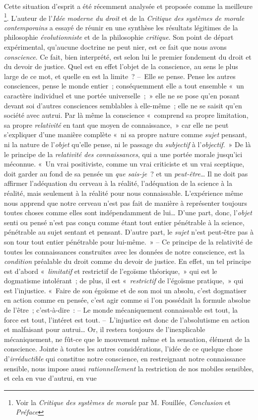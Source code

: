 \documentclass[french,twoside]{book} %
\begin{document}
Cette situation d’esprit a été récemment analysée et proposée comme la meilleure \footnote{Voir la \emph{Critique des systèmes de morale} par M. Fouillée, \emph{Conclusion} et \emph{Préface}}. L’auteur de l’\emph{Idée moderne du droit} et de la \emph{Critique des systèmes de morale contemporains} a essayé de réunir en une synthèse les résultats légitimes de la philosophie \emph{évolutionniste} et de la philosophie \emph{critique}. Son point de départ expérimental, qu’aucune doctrine ne peut nier, est ce fait que nous avons \emph{conscience}. Ce fait, bien interprété, est selon lui le premier fondement du droit et du devoir de justice. Quel est en effet l’objet de la conscience, au sens le plus large de ce mot, et quelle en est la limite ? – Elle se pense. Pense les autres consciences, pense le monde entier ; conséquemment elle a tout ensemble « un caractère individuel et une portée universelle ; » elle ne se pose qu’en posant devant soi d’autres consciences semblables à elle-même ; elle ne se saisit qu’en société avec autrui. Par là même la conscience « comprend sa propre limitation, sa propre \emph{relativité} en tant que moyen de connaissance, » car elle ne peut s’expliquer d’une manière complète « ni sa propre nature comme \emph{sujet} pensant, ni la nature de l’\emph{objet} qu’elle pense, ni le passage du \emph{subjectif} à l’\emph{objectif}. » De là le principe de la \emph{relativité des connaissances}, qui a une portée morale jusqu’ici méconnue. « Un vrai positiviste, comme un vrai criticiste et un vrai sceptique, doit garder au fond de sa pensée un \emph{que sais-je} ? et un \emph{peut-être}… Il ne doit pas affirmer l’adéquation du cerveau à la réalité, l’adéquation de la science à la réalité, mais seulement à la réalité pour nous connaissable. L’expérience même nous apprend que notre cerveau n’est pas fait de manière à représenter toujours toutes choses comme elles sont indépendamment de lui… D’une part, donc, l’\emph{objet} senti ou pensé n’est pas conçu comme étant tout entier pénétrable à la science, pénétrable au sujet sentant et pensant. D’autre part, le \emph{sujet} n’est peut-être pas à son tour tout entier pénétrable pour lui-même. » – Ce principe de la relativité de toutes les connaissances construites avec les données de notre conscience, est la \emph{condition} préalable du droit comme du devoir de justice. En effet, un tel principe est d’abord « \emph{limitatif} et restrictif de l’egoïsme théorique, » qui est le dogmatisme intolérant ; de plus, il est « \emph{restrictif} de l’égoïsme pratique, » qui est l’injustice. « Faire de son égoïsme et de son moi un absolu, c’est dogmatiser en action comme en pensée, c’est agir comme si l’on possédait la formule absolue de l’être ; c’est-à-dire : – Le monde mécaniquement connaissable est tout, la force est tout, l’intéret est tout. – L’injustice est donc de l’absolutisme en action et malfaisant pour autrui… Or, il restera toujours de l’inexplicable mécaniquement, ne fût-ce que le mouvement même et la sensation, élément de la conscience. Jointe à toutes les autres considérations, l’idée de ce quelque chose d’\emph{irréductible} qui constitue notre conscience, en restreignant notre connaissance sensible, nous impose aussi \emph{rationnellement} la restriction de nos mobiles sensibles, et cela en vue d’autrui, en vue 
\end{document}
